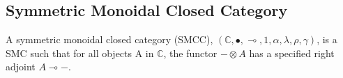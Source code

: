 \subsection{Symmetric Monoidal Closed Category}
\label{subsec:symmetric_monoidal_closded_category}
\begin{definition}
    A symmetric monoidal closed category (SMCC), $(\mathbb{C},\bullet,\multimap,1,\alpha,\lambda,\rho,\gamma)$,
    is a SMC such that for all objects A in $\mathbb{C}$, the functor $-\otimes A$ has a specified right adjoint $A\multimap -$.
\end{definition}